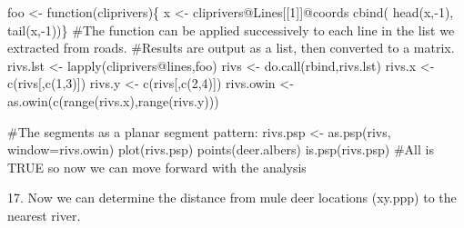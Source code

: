 \documentclass[
  letterpaper,
]{book}
\newenvironment{Shaded}{\begin{snugshade}}{\end{snugshade}}
\newcommand{\AttributeTok}[1]{\textcolor[rgb]{0.40,0.45,0.13}{#1}}
\newcommand{\CommentTok}[1]{\textcolor[rgb]{0.37,0.37,0.37}{#1}}
\newcommand{\ControlFlowTok}[1]{\textcolor[rgb]{0.00,0.23,0.31}{#1}}
\newcommand{\DecValTok}[1]{\textcolor[rgb]{0.68,0.00,0.00}{#1}}
\newcommand{\FunctionTok}[1]{\textcolor[rgb]{0.28,0.35,0.67}{#1}}
\newcommand{\NormalTok}[1]{\textcolor[rgb]{0.00,0.23,0.31}{#1}}
\newcommand{\OtherTok}[1]{\textcolor[rgb]{0.00,0.23,0.31}{#1}}
\newcommand{\SpecialCharTok}[1]{\textcolor[rgb]{0.37,0.37,0.37}{#1}}
\begin{document}
\begin{Shaded}
\begin{Highlighting}[]
\NormalTok{foo }\OtherTok{\textless{}{-}} \ControlFlowTok{function}\NormalTok{(cliprivers)\{}
\NormalTok{x }\OtherTok{\textless{}{-}}\NormalTok{ cliprivers}\SpecialCharTok{@}\NormalTok{Lines[[}\DecValTok{1}\NormalTok{]]}\SpecialCharTok{@}\NormalTok{coords}
\FunctionTok{cbind}\NormalTok{(}
\FunctionTok{head}\NormalTok{(x,}\SpecialCharTok{{-}}\DecValTok{1}\NormalTok{),}
\FunctionTok{tail}\NormalTok{(x,}\SpecialCharTok{{-}}\DecValTok{1}\NormalTok{))\}}
\CommentTok{\#The function can be applied successively to each line in the list we extracted from roads. }
\CommentTok{\#Results are output as a list, then converted to a matrix.}
\NormalTok{rivs.lst }\OtherTok{\textless{}{-}} \FunctionTok{lapply}\NormalTok{(cliprivers}\SpecialCharTok{@}\NormalTok{lines,foo)}
\NormalTok{rivs }\OtherTok{\textless{}{-}} \FunctionTok{do.call}\NormalTok{(rbind,rivs.lst)}
\NormalTok{rivs.x }\OtherTok{\textless{}{-}} \FunctionTok{c}\NormalTok{(rivs[,}\FunctionTok{c}\NormalTok{(}\DecValTok{1}\NormalTok{,}\DecValTok{3}\NormalTok{)])}
\NormalTok{rivs.y }\OtherTok{\textless{}{-}} \FunctionTok{c}\NormalTok{(rivs[,}\FunctionTok{c}\NormalTok{(}\DecValTok{2}\NormalTok{,}\DecValTok{4}\NormalTok{)])}
\NormalTok{rivs.owin }\OtherTok{\textless{}{-}} \FunctionTok{as.owin}\NormalTok{(}\FunctionTok{c}\NormalTok{(}\FunctionTok{range}\NormalTok{(rivs.x),}\FunctionTok{range}\NormalTok{(rivs.y)))}

\CommentTok{\#The segments as a planar segment pattern:}
\NormalTok{rivs.psp }\OtherTok{\textless{}{-}} \FunctionTok{as.psp}\NormalTok{(rivs, }\AttributeTok{window=}\NormalTok{rivs.owin)}
\FunctionTok{plot}\NormalTok{(rivs.psp)}
\FunctionTok{points}\NormalTok{(deer.albers)}
\FunctionTok{is.psp}\NormalTok{(rivs.psp)}
\CommentTok{\#All is TRUE so now we can move forward with the analysis}
\end{Highlighting}
\end{Shaded}

17. Now we can determine the distance from mule deer locations (xy.ppp)
to the nearest river.
\end{document}
